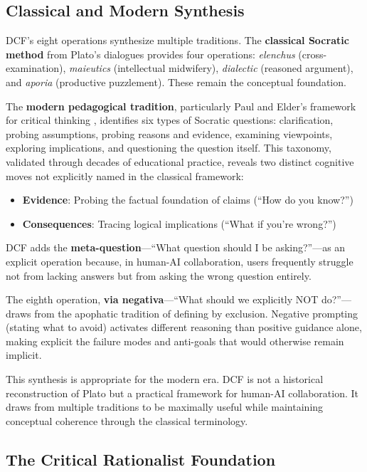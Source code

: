 \subsection{Classical and Modern Synthesis}

DCF's eight operations synthesize multiple traditions. The \textbf{classical Socratic method} from Plato's dialogues provides four operations: \emph{elenchus} (cross-examination), \emph{maieutics} (intellectual midwifery), \emph{dialectic} (reasoned argument), and \emph{aporia} (productive puzzlement). These remain the conceptual foundation.

The \textbf{modern pedagogical tradition}, particularly Paul and Elder's framework for critical thinking \cite{paul2006thinkers}, identifies six types of Socratic questions: clarification, probing assumptions, probing reasons and evidence, examining viewpoints, exploring implications, and questioning the question itself. This taxonomy, validated through decades of educational practice, reveals two distinct cognitive moves not explicitly named in the classical framework:

\begin{itemize}
    \item \textbf{Evidence}: Probing the factual foundation of claims (``How do you know?'')
    \item \textbf{Consequences}: Tracing logical implications (``What if you're wrong?'')
\end{itemize}

DCF adds the \textbf{meta-question}---``What question should I be asking?''---as an explicit operation because, in human-AI collaboration, users frequently struggle not from lacking answers but from asking the wrong question entirely.

The eighth operation, \textbf{via negativa}---``What should we explicitly NOT do?''---draws from the apophatic tradition of defining by exclusion. Negative prompting (stating what to avoid) activates different reasoning than positive guidance alone, making explicit the failure modes and anti-goals that would otherwise remain implicit.

This synthesis is appropriate for the modern era. DCF is not a historical reconstruction of Plato but a practical framework for human-AI collaboration. It draws from multiple traditions to be maximally useful while maintaining conceptual coherence through the classical terminology.

\subsection{The Critical Rationalist Foundation}

